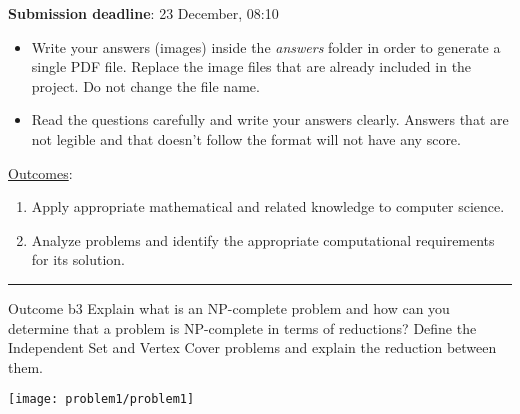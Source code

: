 



\textbf{Submission deadline}: 23 December, 08:10

\begin{itemize}
    \item Write your answers (images) inside the \emph{answers} folder in order to generate a single PDF file. Replace the image files that are already included in the project. Do not change the file name.
    \item Read the questions carefully and write your answers clearly. Answers that are not legible and that doesn't follow the format will not have any score. 
\end{itemize}

\underline{Outcomes}:

\begin{enumerate}[label=\alph*.]
    \item Apply appropriate mathematical and related knowledge to computer science.
    \item Analyze problems and identify the appropriate computational requirements for its solution.
\end{enumerate}
\noindent\rule{\textwidth}{0.01pt}
\vspace{3mm}

\begin{problem}{Outcome b}{3}
    Explain what is an NP-complete problem and how can you determine that a problem is NP-complete in terms of reductions? Define the Independent Set and Vertex Cover problems and explain the reduction between them.
    
    \begin{center}
        \texttt{[image: problem1/problem1]}%
    \end{center}

\end{problem}

